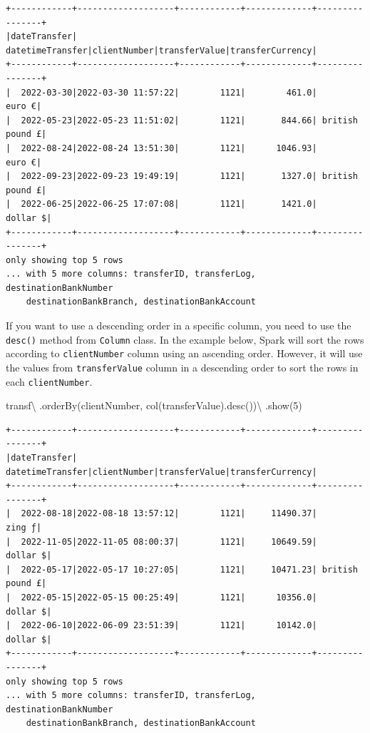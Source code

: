\documentclass[
  11pt,
  letterpaper,
  DIV=11,
  numbers=noendperiod]{scrreprt}
\newenvironment{Shaded}{\begin{snugshade}}{\end{snugshade}}
\newcommand{\DecValTok}[1]{\textcolor[rgb]{0.68,0.00,0.00}{#1}}
\newcommand{\NormalTok}[1]{\textcolor[rgb]{0.00,0.23,0.31}{#1}}
\newcommand{\OperatorTok}[1]{\textcolor[rgb]{0.37,0.37,0.37}{#1}}
\newcommand{\StringTok}[1]{\textcolor[rgb]{0.13,0.47,0.30}{#1}}
\begin{document}
\begin{verbatim}
+------------+-------------------+------------+-------------+----------------+
|dateTransfer|   datetimeTransfer|clientNumber|transferValue|transferCurrency|
+------------+-------------------+------------+-------------+----------------+
|  2022-03-30|2022-03-30 11:57:22|        1121|        461.0|          euro €|
|  2022-05-23|2022-05-23 11:51:02|        1121|       844.66| british pound £|
|  2022-08-24|2022-08-24 13:51:30|        1121|      1046.93|          euro €|
|  2022-09-23|2022-09-23 19:49:19|        1121|       1327.0| british pound £|
|  2022-06-25|2022-06-25 17:07:08|        1121|       1421.0|        dollar $|
+------------+-------------------+------------+-------------+----------------+
only showing top 5 rows
... with 5 more columns: transferID, transferLog, destinationBankNumber
    destinationBankBranch, destinationBankAccount
\end{verbatim}

If you want to use a descending order in a specific column, you need to
use the \texttt{desc()} method from \texttt{Column} class. In the
example below, Spark will sort the rows according to
\texttt{clientNumber} column using an ascending order. However, it will
use the values from \texttt{transferValue} column in a descending order
to sort the rows in each \texttt{clientNumber}.

\begin{Shaded}
\begin{Highlighting}[]
\NormalTok{transf}\OperatorTok{\textbackslash{}}
\NormalTok{  .orderBy(}\StringTok{\textquotesingle{}clientNumber\textquotesingle{}}\NormalTok{, col(}\StringTok{\textquotesingle{}transferValue\textquotesingle{}}\NormalTok{).desc())}\OperatorTok{\textbackslash{}}
\NormalTok{  .show(}\DecValTok{5}\NormalTok{)}
\end{Highlighting}
\end{Shaded}

\begin{verbatim}
+------------+-------------------+------------+-------------+----------------+
|dateTransfer|   datetimeTransfer|clientNumber|transferValue|transferCurrency|
+------------+-------------------+------------+-------------+----------------+
|  2022-08-18|2022-08-18 13:57:12|        1121|     11490.37|          zing ƒ|
|  2022-11-05|2022-11-05 08:00:37|        1121|     10649.59|        dollar $|
|  2022-05-17|2022-05-17 10:27:05|        1121|     10471.23| british pound £|
|  2022-05-15|2022-05-15 00:25:49|        1121|      10356.0|        dollar $|
|  2022-06-10|2022-06-09 23:51:39|        1121|      10142.0|        dollar $|
+------------+-------------------+------------+-------------+----------------+
only showing top 5 rows
... with 5 more columns: transferID, transferLog, destinationBankNumber
    destinationBankBranch, destinationBankAccount
\end{verbatim}
\end{document}
